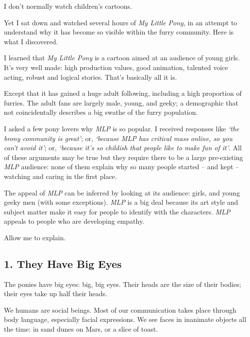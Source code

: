 
I don't normally watch children's cartoons.

Yet I sat down and watched several hours of \textit{My Little Pony}, in an attempt to understand why it has become so visible within the furry community. Here is what I discovered.

I learned that \textit{My Little Pony} is a cartoon aimed at an audience of young girls. It's very well made: high production values, good animation, talented voice acting, robust and logical stories. That's basically all it is.

Except that it has gained a huge adult following, including a high proportion of furries. The adult fans are largely male, young, and geeky; a demographic that not coincidentally describes a big swathe of the furry population.

I asked a few pony lovers why \textit{MLP} is so popular. I received responses like \textit{`the brony community is great'}; or, \textit{`because \textit{MLP} has critical mass online, so you can't avoid it'}; or, \textit{`because it's so childish that people like to make fun of it'}. All of these arguments may be true but they require there to be a large pre-existing \textit{MLP} audience: none of them explain why so many people started -- and kept -- watching and caring in the first place.

The appeal of \textit{MLP} can be inferred by looking at its audience: girls, and young geeky men (with some exceptions). \textit{MLP} is a big deal because its art style and subject matter make it easy for people to identify with the characters. \textit{MLP} appeals to people who are developing empathy.

Allow me to explain.

\subsection*{1. They Have Big Eyes}

The ponies have big eyes: big, big eyes. Their heads are the size of their bodies; their eyes take up half their heads.

We humans are social beings. Most of our communication takes place through body language, especially facial expressions. We see faces in inanimate objects all the time: in sand dunes on Mars, or a slice of toast.

